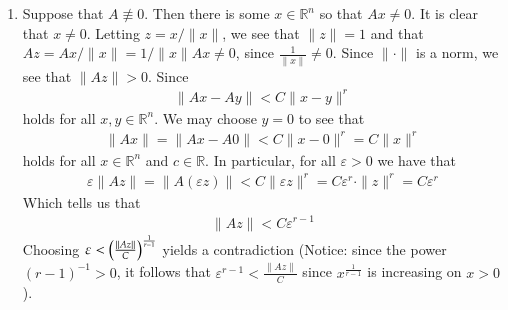 \documentclass[12pt]{article}
\theoremstyle{definitionstyle}
\def\mbb#1{\mathbb{#1}}
\def \R{\mbb{R}}
\def \ve{\varepsilon}
\newcommand{\mg}[1]{\| #1 \|}
\begin{document}
\begin{enumerate}[leftmargin=\labelsep]
		\item Suppose that $A \not \equiv 0$. Then there is some $x \in \R^n$ so that $Ax \neq 0$. It is clear that $x \neq 0$. Letting $z = x / \mg{x}$, we see that $\mg{z} = 1$ and that $Az = A x / \mg{x} = 1/\mg{x} Ax \neq 0$, since $\frac{1}{\mg{x}} \neq 0$. Since $\mg{\cdot}$ is a norm, we see that $\mg{Az} > 0$. Since
		\begin{align*}
			\mg{Ax - Ay} < C\mg{x-y}^r
		\end{align*}
		holds for all $x, y \in \R^n$. We may choose $y = 0$ to see that
		\begin{align*}
			\mg{Ax} = \mg{Ax - A0} < C\mg{x-0}^r = C\mg{x}^r
		\end{align*}
		holds for all $x \in \R^n$ and $c \in \R$. In particular, for all $\ve > 0$ we have that
		\begin{align*}
			\ve \mg{Az} = \mg{A(\ve z)} < C \mg{\ve z}^r = C\ve^r \cdot \mg{z}^r = C\ve^r
		\end{align*}
		Which tells us that 
		\begin{align*}
			\mg{Az} < C \ve^{r-1}
		\end{align*}
		Choosing $\ve < \qty(\frac{\mg{Az}}{C})^{\frac{1}{r-1}}$ yields a contradiction (Notice: since the power $(r-1)^{-1} > 0$, it follows that $\ve^{r-1} < \frac{\mg{Az}}{C}$ since $x^{\frac{1}{r-1}}$ is increasing on $x > 0$). 
	\end{enumerate}
\end{document}
